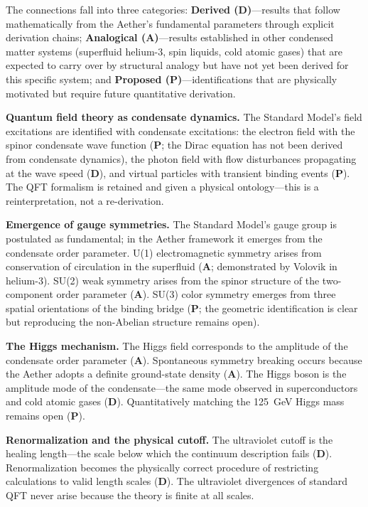 \documentclass[12pt,letterpaper]{article}
\begin{document}
The connections fall into three categories:
\textbf{Derived (D)}---results that follow mathematically from the Aether's
fundamental parameters through explicit derivation chains;
\textbf{Analogical (A)}---results established in other condensed matter systems
(superfluid helium-3, spin liquids, cold atomic gases) that are expected to carry
over by structural analogy but have not yet been derived for this specific system;
and \textbf{Proposed (P)}---identifications that are physically motivated but
require future quantitative derivation.

\textbf{Quantum field theory as condensate dynamics.}
The Standard Model's field excitations are identified with condensate excitations:
the electron field with the spinor condensate wave function (\textbf{P}; the Dirac
equation has not been derived from condensate dynamics), the photon field with
flow disturbances propagating at the wave speed (\textbf{D}), and virtual particles
with transient binding events (\textbf{P}).  The QFT formalism is retained and
given a physical ontology---this is a reinterpretation, not a re-derivation.

\textbf{Emergence of gauge symmetries.}
The Standard Model's gauge group is postulated as fundamental; in the Aether
framework it emerges from the condensate order parameter.  U(1) electromagnetic
symmetry arises from conservation of circulation in the superfluid (\textbf{A};
demonstrated by Volovik \cite{volovik2003} in helium-3).  SU(2) weak symmetry
arises from the spinor structure of the two-component order parameter (\textbf{A}).
SU(3) color symmetry emerges from three spatial orientations of the binding bridge
(\textbf{P}; the geometric identification is clear but reproducing the non-Abelian
structure remains open).

\textbf{The Higgs mechanism.}
The Higgs field corresponds to the amplitude of the condensate order parameter
(\textbf{A}).  Spontaneous symmetry breaking occurs because the Aether adopts a
definite ground-state density (\textbf{A}).  The Higgs boson is the amplitude mode
of the condensate---the same mode observed in superconductors and cold atomic gases
(\textbf{D}).  Quantitatively matching the 125~GeV Higgs mass remains open (\textbf{P}).

\textbf{Renormalization and the physical cutoff.}
The ultraviolet cutoff is the healing length---the scale below which the continuum
description fails (\textbf{D}).  Renormalization becomes the physically correct
procedure of restricting calculations to valid length scales (\textbf{D}).  The
ultraviolet divergences of standard QFT never arise because the theory is finite
at all scales.
\end{document}
